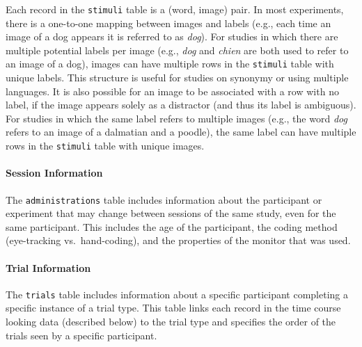 \documentclass[
  english,
  man,floatsintext]{apa6}
\let\oldparagraph\paragraph
\renewcommand{\paragraph}[1]{\oldparagraph{#1}\mbox{}}
\providecommand{\DIFaddtex}[1]{{\protect\color{blue}{#1}}} %
\providecommand{\DIFaddbegin}{} %
\providecommand{\DIFaddend}{} %
\providecommand{\DIFadd}[1]{\texorpdfstring{\DIFaddtex{#1}}{#1}} %
\newcommand{\DIFaddincludegraphics}[2][]{{\color{blue}\fbox{\DIFOincludegraphics[#1]{#2}}}} %
\DeclareRobustCommand{\DIFaddbegin}{\DIFOaddbegin \let\includegraphics\DIFaddincludegraphics} %
\DeclareRobustCommand{\DIFaddend}{\DIFOaddend \let\includegraphics\DIFOincludegraphics} %
\begin{document}
Each record in the \texttt{stimuli} table is a (word, image) pair.
In most experiments, there is a one-to-one mapping between images and labels (e.g., each time an image of a dog appears it is referred to as \emph{dog}).
For studies in which there are multiple potential labels per image (e.g., \emph{dog} and \emph{chien} are both used to refer to an image of a dog), images can have multiple rows in the \texttt{stimuli} table with unique labels.
This structure is useful for studies on synonymy or using multiple languages.
It is also possible for an image to be associated with a row with no label, if the image appears solely as a distractor (and thus its label is ambiguous).
For studies in which the same label refers to multiple images (e.g., the word \emph{dog} refers to an image of a dalmatian and a poodle), the same label can have multiple rows in the \texttt{stimuli} table with unique images.

\hypertarget{session-information}{%
\paragraph{Session Information}\label{session-information}}

The \texttt{administrations} table includes information about the participant or experiment that may change between sessions of the same study, even for the same participant.
This includes the age of the participant, the coding method (eye-tracking vs.~hand-coding), and the properties of the monitor that was used.
\DIFaddbegin \DIFadd{For participant age, we include the fields }\texttt{\DIFadd{lab\_age}} \DIFadd{and }\texttt{\DIFadd{lab\_age\_units}} \DIFadd{to record how the original lab encoded age, as well as an additional field, }\texttt{\DIFadd{age}}\DIFadd{, to encode age in a standardized format across datasets, using standardized months as the common unit of measurement (see the Peekbank codebook for details on how ages are converted into months).
}\DIFaddend 

\hypertarget{trial-information}{%
\paragraph{Trial Information}\label{trial-information}}

The \texttt{trials} table includes information about a specific participant completing a specific instance of a trial type.
This table links each record in the time course looking data (described below) to the trial type and specifies the order of the trials seen by a specific participant.
\end{document}
